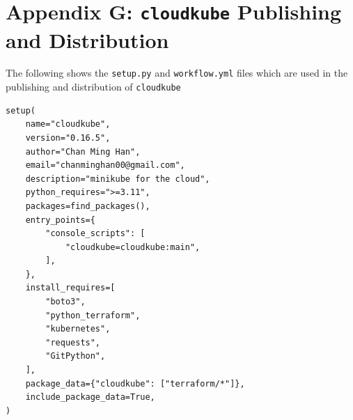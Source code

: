 \chapter{Appendix G: \texttt{cloudkube} Publishing and Distribution}
\label{appendix:cloudkube-distribution}

The following shows the \texttt{setup.py} and \texttt{workflow.yml} files which are used in the publishing and distribution of \texttt{cloudkube}


\begin{lstlisting}[xleftmargin=10pt, caption={\texttt{setup.py} file for Python Packaging}]
setup(
    name="cloudkube",
    version="0.16.5",
    author="Chan Ming Han",
    email="chanminghan00@gmail.com",
    description="minikube for the cloud",
    python_requires=">=3.11",
    packages=find_packages(),
    entry_points={
        "console_scripts": [
            "cloudkube=cloudkube:main",
        ],
    },
    install_requires=[
        "boto3",
        "python_terraform",
        "kubernetes",
        "requests",
        "GitPython",
    ],
    package_data={"cloudkube": ["terraform/*"]},
    include_package_data=True,
)
\end{lstlisting}

